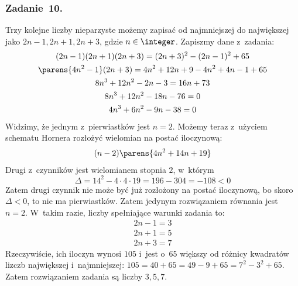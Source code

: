 \subsubsection*{Zadanie~10.}
Trzy kolejne liczby nieparzyste możemy zapisać od najmniejszej do największej jako \(2n - 1, 2n + 1, 2n + 3\), gdzie \(n \in \integer\). Zapiszmy dane z~zadania:
\begin{gather*}
    (2n - 1)(2n + 1)(2n + 3) = (2n + 3)^2 - (2n - 1)^2 + 65\\
    \parens{4n^2 - 1}(2n + 3) = 4n^2 + 12n + 9 - 4n^2 + 4n - 1 + 65\\
    8n^3 + 12n^2 - 2n - 3 = 16n + 73\\
    8n^3 + 12n^2 - 18n - 76 = 0\\
    4n^3 + 6n^2 - 9n - 38 = 0
\end{gather*}
Widzimy, że jednym z~pierwiastków jest \(n = 2\). Możemy teraz z~użyciem schematu Hornera rozłożyć wielomian na postać iloczynową:
\begin{gather*}
    (n - 2)\parens{4n^2 + 14n + 19}
\end{gather*}
Drugi z~czynników jest wielomianem stopnia \(2\), w~którym
\begin{equation*}
    \Delta = 14^2 - 4 \cdot 4 \cdot 19 = 196 - 304 = -108 < 0
\end{equation*}
Zatem drugi czynnik nie może być już rozłożony na postać iloczynową, bo skoro \(\Delta < 0\), to nie ma pierwiastków. Zatem jedynym rozwiązaniem równania jest \(n = 2\). W~takim razie, liczby spełniające warunki zadania to:
\begin{gather*}
    2n - 1 = 3\\
    2n + 1 = 5\\
    2n + 3 = 7
\end{gather*}
Rzeczywiście, ich iloczyn wynosi \(105\) i~jest o~\(65\) większy od różnicy kwadratów lizczb największej i~najmniejszej: \(105 = 40 + 65 = 49 - 9 + 65 = 7^2 - 3^2 + 65\). Zatem rozwiązaniem zadania są liczby \(3, 5, 7\).
